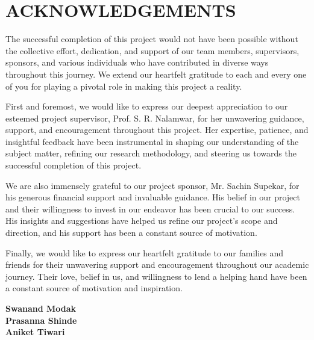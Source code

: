 \chapter*{ACKNOWLEDGEMENTS}
The successful completion of this project would not have been possible without the collective effort, dedication, and support of our team members, supervisors, sponsors, and various individuals who have contributed in diverse ways throughout this journey. We extend our heartfelt gratitude to each and every one of you for playing a pivotal role in making this project a reality.

First and foremost, we would like to express our deepest appreciation to our esteemed project supervisor, Prof. S. R. Nalamwar, for her unwavering guidance, support, and encouragement throughout this project. Her expertise, patience, and insightful feedback have been instrumental in shaping our understanding of the subject matter, refining our research methodology, and steering us towards the successful completion of this project.

We are also immensely grateful to our project sponsor, Mr. Sachin Supekar, for his generous financial support and invaluable guidance. His belief in our project and their willingness to invest in our endeavor has been crucial to our success. His insights and suggestions have helped us refine our project's scope and direction, and his support has been a constant source of motivation.

Finally, we would like to express our heartfelt gratitude to our families and friends for their unwavering support and encouragement throughout our academic journey. Their love, belief in us, and willingness to lend a helping hand have been a constant source of motivation and inspiration.
\begin{flushright}
    \textbf{Swanand Modak \\ Prasanna Shinde \\ Aniket Tiwari}
\end{flushright}
